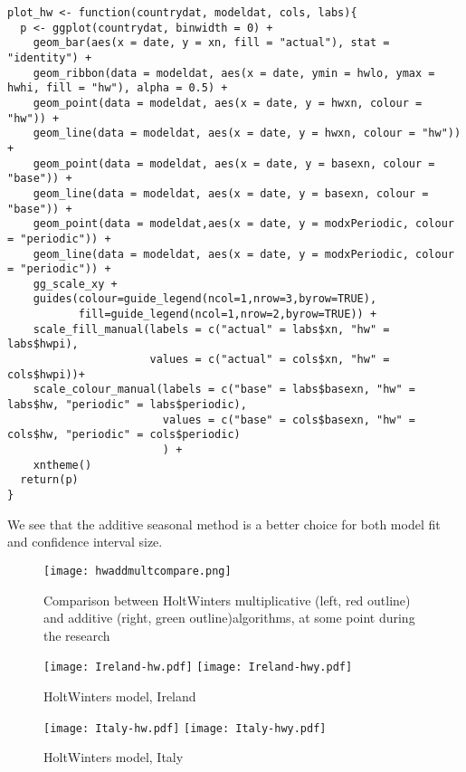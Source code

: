 \begin{lstlisting}[frame=single]
plot_hw <- function(countrydat, modeldat, cols, labs){
  p <- ggplot(countrydat, binwidth = 0) + 
    geom_bar(aes(x = date, y = xn, fill = "actual"), stat = "identity") + 
    geom_ribbon(data = modeldat, aes(x = date, ymin = hwlo, ymax = hwhi, fill = "hw"), alpha = 0.5) +
    geom_point(data = modeldat, aes(x = date, y = hwxn, colour = "hw")) + 
    geom_line(data = modeldat, aes(x = date, y = hwxn, colour = "hw")) +
    geom_point(data = modeldat, aes(x = date, y = basexn, colour = "base")) + 
    geom_line(data = modeldat, aes(x = date, y = basexn, colour = "base")) +
    geom_point(data = modeldat,aes(x = date, y = modxPeriodic, colour = "periodic")) +
    geom_line(data = modeldat, aes(x = date, y = modxPeriodic, colour = "periodic")) +
    gg_scale_xy + 
    guides(colour=guide_legend(ncol=1,nrow=3,byrow=TRUE),
           fill=guide_legend(ncol=1,nrow=2,byrow=TRUE)) +
    scale_fill_manual(labels = c("actual" = labs$xn, "hw" = labs$hwpi),
                      values = c("actual" = cols$xn, "hw" = cols$hwpi))+ 
    scale_colour_manual(labels = c("base" = labs$basexn, "hw" = labs$hw, "periodic" = labs$periodic),
                        values = c("base" = cols$basexn, "hw" = cols$hw, "periodic" = cols$periodic)
                        ) +
    xntheme()
  return(p)
}

\end{lstlisting}


We see that the additive seasonal method is a better choice for both model fit and confidence interval size.

\begin{figure}[H]
\texttt{[image: hwaddmultcompare.png]}
\endminipage
\caption{Comparison between HoltWinters multiplicative (left, red outline) and additive (right, green outline)algorithms, at some point during the research}
\end{figure}

\begin{figure}[H]
  \texttt{[image: Ireland-hw.pdf]} \label{fig:ireland-hw}
\endminipage\hfill
{}
  \texttt{[image: Ireland-hwy.pdf]} \label{fig:ireland-hwy}
\endminipage
\caption{HoltWinters model, Ireland}
\end{figure}

\begin{figure}[H]
  \texttt{[image: Italy-hw.pdf]} \label{fig:italy-hw}
\endminipage\hfill
{}
  \texttt{[image: Italy-hwy.pdf]} \label{fig:italy-hwy}
\endminipage
\caption{HoltWinters model, Italy}
\end{figure}


